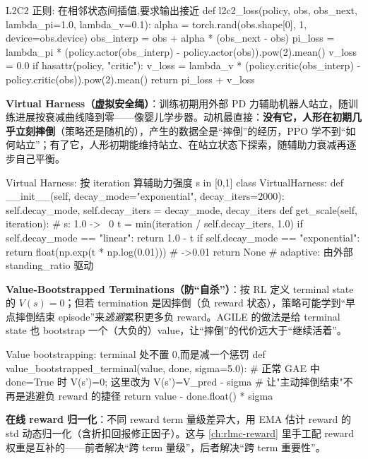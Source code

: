\begin{codebox}[Python]{L2C2 正则: 在相邻状态间插值,要求输出接近}
def l2c2_loss(policy, obs, obs_next, lambda_pi=1.0, lambda_v=0.1):
    alpha = torch.rand(obs.shape[0], 1, device=obs.device)
    obs_interp = obs + alpha * (obs_next - obs)
    pi_loss = lambda_pi * (policy.actor(obs_interp) - policy.actor(obs)).pow(2).mean()
    v_loss  = 0.0
    if hasattr(policy, "critic"):
        v_loss = lambda_v * (policy.critic(obs_interp) - policy.critic(obs)).pow(2).mean()
    return pi_loss + v_loss
\end{codebox}

\textbf{Virtual Harness（虚拟安全绳）}：训练初期用外部 PD 力辅助机器人站立，随训练进展按衰减曲线降到零——像婴儿学步器。动机最直接：\textbf{没有它，人形在初期几乎立刻摔倒}（策略还是随机的），产生的数据全是“摔倒”的经历，PPO 学不到“如何站立”；有了它，人形初期能维持站立、在站立状态下探索，随辅助力衰减再逐步自己平衡。

\begin{codebox}[Python]{Virtual Harness: 按 iteration 算辅助力强度 s in [0,1]}
class VirtualHarness:
    def __init__(self, decay_mode="exponential", decay_iters=2000):
        self.decay_mode, self.decay_iters = decay_mode, decay_iters
    def get_scale(self, iteration):                    # s: 1.0 -> ~0
        t = min(iteration / self.decay_iters, 1.0)
        if self.decay_mode == "linear":       return 1.0 - t
        if self.decay_mode == "exponential":  return float(np.exp(t * np.log(0.01)))  # ->0.01
        return None                                    # adaptive: 由外部 standing_ratio 驱动
\end{codebox}

\textbf{Value-Bootstrapped Terminations（防“自杀”）}：按 RL 定义 terminal state 的 $V(s)=0$；但若 termination 是因摔倒（负 reward 状态），策略可能学到“早点摔倒结束 episode”来\emph{逃避}累积更多负 reward。AGILE 的做法是给 terminal state 也 bootstrap 一个（大负的）value，让“摔倒”的代价远大于“继续活着”。

\begin{codebox}[Python]{Value bootstrapping: terminal 处不置 0,而是减一个惩罚}
def value_bootstrapped_terminal(value, done, sigma=5.0):
    # 正常 GAE 中 done=True 时 V(s')=0; 这里改为 V(s')=V_pred - sigma
    # 让"主动摔倒结束"不再是逃避负 reward 的捷径
    return value - done.float() * sigma
\end{codebox}

\textbf{在线 reward 归一化}：不同 reward term 量级差异大，用 EMA 估计 reward 的 std 动态归一化（含折扣回报修正因子）。这与 \cref{ch:rlmc-reward} 里手工配 reward 权重是互补的——前者解决“跨 term 量级”，后者解决“跨 term 重要性”。

